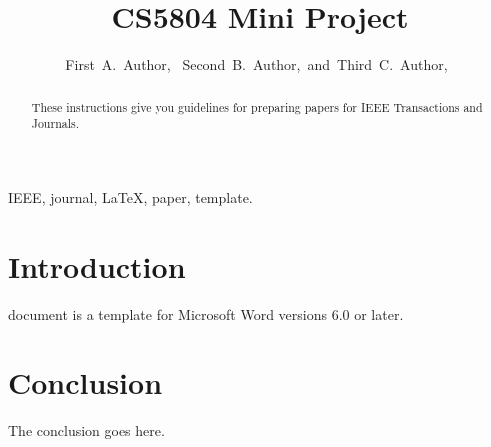 \documentclass[journal]{IEEEtran}
\begin{document}
\title{CS5804 Mini Project}

\author{First~A.~Author,~
        Second~B.~Author,~and~Third~C.~Author,~%
}

\maketitle

\begin{abstract}
These instructions give you guidelines for preparing papers for IEEE Transactions and Journals. 
\end{abstract}

\begin{IEEEkeywords}
IEEE, journal, \LaTeX, paper, template.
\end{IEEEkeywords}

\section{Introduction}
 document\cite{RN2} is a template\cite{RN3} for Microsoft\cite{RN4} Word\cite{RN5} versions\cite{RN6} 6.0 or later.

\section{Conclusion}
The conclusion goes here.



\end{document}
